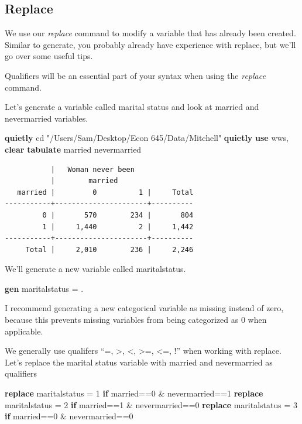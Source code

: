\documentclass[
]{book}
\newenvironment{Shaded}{\begin{snugshade}}{\end{snugshade}}
\newcommand{\KeywordTok}[1]{\textcolor[rgb]{0.13,0.29,0.53}{\textbf{#1}}}
\newcommand{\NormalTok}[1]{#1}
\newcommand{\StringTok}[1]{\textcolor[rgb]{0.31,0.60,0.02}{#1}}
\begin{document}
\subsection{Replace}\label{replace}

We use our \emph{replace} command to modify a variable that has already been created. Similar to generate, you probably already have experience with replace, but we'll go over some useful tips.

Qualifiers will be an essential part of your syntax when using the \emph{replace} command.

Let's generate a variable called marital status and look at married and nevermarried variables.

\begin{Shaded}
\begin{Highlighting}[]
\KeywordTok{quietly}\NormalTok{ cd }\StringTok{"/Users/Sam/Desktop/Econ 645/Data/Mitchell"}
\KeywordTok{quietly} \KeywordTok{use}\NormalTok{ wws, }\KeywordTok{clear}
\KeywordTok{tabulate}\NormalTok{ married nevermarried}
\end{Highlighting}
\end{Shaded}

\begin{verbatim}
           |   Woman never been
           |        married
   married |         0          1 |     Total
-----------+----------------------+----------
         0 |       570        234 |       804 
         1 |     1,440          2 |     1,442 
-----------+----------------------+----------
     Total |     2,010        236 |     2,246 
\end{verbatim}

We'll generate a new variable called maritalstatus.

\begin{Shaded}
\begin{Highlighting}[]
\KeywordTok{gen}\NormalTok{ maritalstatus = .}
\end{Highlighting}
\end{Shaded}

I recommend generating a new categorical variable as missing instead of zero, because this prevents missing variables from being categorized as 0 when applicable.

We generally use qualifers ``=, \textgreater, \textless, \textgreater=, \textless=, !'' when working with replace. Let's replace the marital status variable with married and nevermarried as qualifiers

\begin{Shaded}
\begin{Highlighting}[]
\KeywordTok{replace}\NormalTok{ maritalstatus = 1 }\KeywordTok{if}\NormalTok{ married==0 \& nevermarried==1}
\KeywordTok{replace}\NormalTok{ maritalstatus = 2 }\KeywordTok{if}\NormalTok{ married==1 \& nevermarried==0}
\KeywordTok{replace}\NormalTok{ maritalstatus = 3 }\KeywordTok{if}\NormalTok{ married==0 \& nevermarried==0}
\end{Highlighting}
\end{Shaded}
\end{document}
